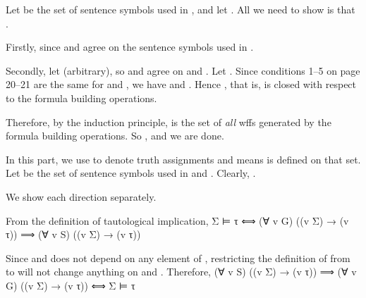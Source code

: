 		\stopitemize
	\stopexercise
	\startsolution
		\startframedtext [width=0.8\makeupwidth, align={flushleft, nonhyphenated, stretch, verytolerant}, frame=off]
		\startitemize [a]

			\item[uniqueness]
				Let  be the set of sentence symbols used in , and let . All we need to show is that .

				Firstly,  since  and  agree on the sentence symbols used in .

				Secondly, let  (arbitrary), so  and  agree on  and . Let . Since conditions 1–5 on page 20–21 are the same for  and , we have  and . Hence , that is,  is closed with respect to the formula building operations.

				Therefore, by the induction principle,  is the set of \emph{all} wffs generated by the formula building operations. So , and we are done.

			\item  In this part, we use  to denote truth assignments and  means  is defined on that set. Let  be the set of sentence symbols used in  and . Clearly, .

				We show each direction separately.

				\qquad
				From the definition of tautological implication,
				\startformula  \startalign[n=3]
					\NC     \NC  Σ ⊨ τ  \NR
					\NC  ⟺  \NC  (∀ v  G) ((v \text{ satisfies } Σ) → (v  τ))  \NR
					\NC  ⟹  \NC  (∀ v  S) ((v  Σ) → (v  τ))  \NC  \text{[Part (\in[uniqueness])]}  \NR
				\stopalign  \stopformula
				
				\bold{(\m{⟸})}\qquad
				Since  and  does not depend on any element of , restricting the definition of  from  to  will not change anything on  and . Therefore,
				\startformula  \startalign
					\NC     \NC  (∀ v  S) ((v \text{ satisfies } Σ) → (v  τ))  \NR
					\NC  ⟹  \NC  (∀ v  G) ((v \text{ satisfies } Σ) → (v  τ))  \NR
					\NC  ⟺  \NC  Σ ⊨ τ  \NR
				\stopalign  \stopformula
		\stopitemize
		\stopframedtext
	\stopsolution

\stopexercises


